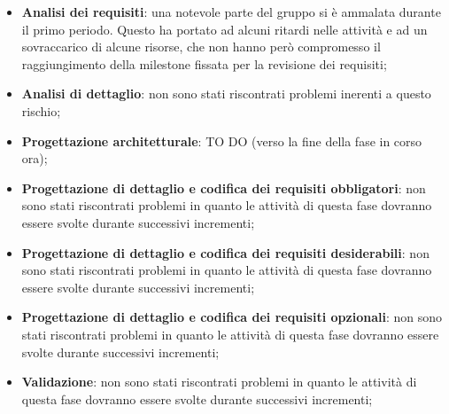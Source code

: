 			\begin{itemize}
				\item \textbf{Analisi dei requisiti}: una notevole parte del gruppo si è ammalata durante il primo periodo. Questo ha portato ad alcuni ritardi nelle attività e ad un sovraccarico di alcune risorse, che non hanno però compromesso il raggiungimento della milestone fissata per la revisione dei requisiti;
				\item \textbf{Analisi di dettaglio}: non sono stati riscontrati problemi inerenti a questo rischio;
				\item \textbf{Progettazione architetturale}: TO DO (verso la fine della fase in corso ora);
				\item \textbf{Progettazione di dettaglio e codifica dei requisiti obbligatori}: non sono stati riscontrati problemi in quanto le attività di questa fase dovranno essere svolte durante successivi incrementi;
				\item \textbf{Progettazione di dettaglio e codifica dei requisiti desiderabili}: non sono stati riscontrati problemi in quanto le attività di questa fase dovranno essere svolte durante successivi incrementi;
				\item \textbf{Progettazione di dettaglio e codifica dei requisiti opzionali}: non sono stati riscontrati problemi in quanto le attività di questa fase dovranno essere svolte durante successivi incrementi;
				\item \textbf{Validazione}: non sono stati riscontrati problemi in quanto le attività di questa fase dovranno essere svolte durante successivi incrementi;
			\end{itemize}

